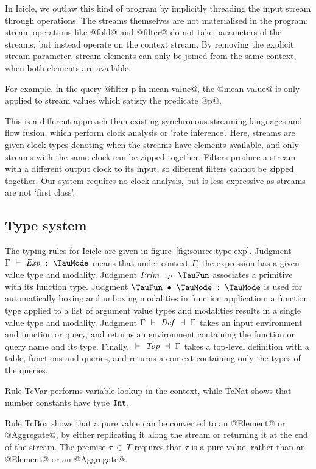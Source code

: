 In Icicle, we outlaw this kind of program by implicitly threading the input stream through operations.
The streams themselves are not materialised in the program: stream operations like @fold@ and @filter@ do not take parameters of the streams, but instead operate on the context stream.
By removing the explicit stream parameter, stream elements can only be joined from the same context, when both elements are available.

For example, in the query @filter p in mean value@, the @mean value@ is only applied to stream values which satisfy the predicate @p@.

This is a different approach than existing synchronous streaming languages\cite{mandel2010lucy} and flow fusion\cite{lippmeier2013data}, which perform clock analysis or `rate inference'.
Here, streams are given clock types denoting when the streams have elements available, and only streams with the same clock can be zipped together.
Filters produce a stream with a different output clock to its input, so different filters cannot be zipped together.
Our system requires no clock analysis, but is less expressive as streams are not `first class'.

\subsection{Type system}

The typing rules for Icicle are given in figure~\ref{fig:source:type:exp}.
Judgment $\Typecheck{\Gamma}{\mi{Exp}}{\TauMode}$ means that under context $\Gamma$, the expression has a given value type and modality.
Judgment $\TypecheckP{\mi{Prim}}{\TauFun}$ associates a primitive with its function type.
Judgment $\TypecheckApp{\TauFun}{\ov{\TauMode}}{\TauMode}$ is used for automatically boxing and unboxing modalities in function application: a function type applied to a list of argument value types and modalities results in a single value type and modality.
Judgment $\TypecheckS{\Gamma}{\mi{Def}}{\Gamma}$ takes an input environment and function or query, and returns an environment containing the function or query name and its type.
Finally, $\TypecheckS{}{\mi{Top}}{\Gamma}$ takes a top-level definition with a table, functions and queries, and returns a context containing only the types of the queries.

Rule TcVar performs variable lookup in the context, while TcNat shows that number constants have type $\mathtt{Int}$.

Rule TcBox shows that a pure value can be converted to an @Element@ or @Aggregate@, by either replicating it along the stream or returning it at the end of the stream.
The premise $\tau~\in~T$ requires that $\tau$ is a pure value, rather than an @Element@ or an @Aggregate@.

